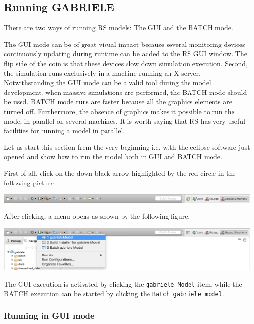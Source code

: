 \documentclass{book}
\begin{document}


\subsection{Running GABRIELE}


There are two ways of running RS models: The GUI and the BATCH mode.

The GUI mode can be of great visual impact because several monitoring devices continuously updating during runtime can be added to the RS GUI window. The flip side of the coin is that these devices slow down simulation execution. Second, the simulation runs exclusively in a machine running an X server. Notwithstanding the GUI mode can be a valid tool during the model development, when massive simulations are performed, the BATCH mode should be used. BATCH mode runs are faster because all the graphics elements are turned off. Furthermore, the absence of graphics makes it possible to run the model in parallel on several machines. It is worth saying that RS has very useful facilities for running a model in parallel.


Let us start this section from the very beginning i.e. with the eclipse software just opened and show how to run the model both in GUI and BATCH mode.

First of all, click on the down black arrow highlighted by the red circle in the following picture

\noindent
\includegraphics[scale=0.35]{fig_gabriele_rs_execution1}

After clicking, a menu opens as shown by the following figure. 

\noindent
\includegraphics[scale=0.35]{fig_gabriele_rs_execution2}

The GUI execution is activated by clicking the \verb+gabriele Model+ item, while the BATCH execution can be started by clicking the \verb+Batch gabriele model+.


\subsubsection{Running in GUI mode}
\end{document}
